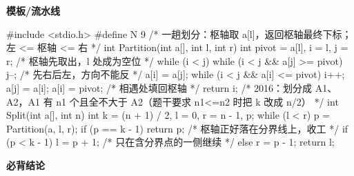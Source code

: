 \documentclass[10pt,a4paper]{ctexart}
\begin{document}
\textbf{模板/流水线}

\begin{codebox}
#include <stdio.h>
#define N 9
/* 一趟划分：枢轴取 a[l]，返回枢轴最终下标；左 <= 枢轴 <= 右 */
int Partition(int a[], int l, int r) {
    int pivot = a[l], i = l, j = r;             /* 枢轴先取出，l 处成为空位 */
    while (i < j) {
        while (i < j && a[j] >= pivot) j--;     /* 先右后左，方向不能反 */
        a[i] = a[j];
        while (i < j && a[i] <= pivot) i++;
        a[j] = a[i];
    }
    a[i] = pivot;                               /* 相遇处填回枢轴 */
    return i;
}
/* 2016：划分成 A1、A2，A1 有 n1 个且全不大于 A2（题干要求 n1<=n2 时把 k 改成 n/2） */
int Split(int a[], int n) {
    int k = (n + 1) / 2, l = 0, r = n - 1, p;
    while (l < r) {
        p = Partition(a, l, r);
        if (p == k - 1) return p;               /* 枢轴正好落在分界线上，收工 */
        if (p < k - 1) l = p + 1;               /* 只在含分界点的一侧继续 */
        else r = p - 1;
    }
    return l;
}
\end{codebox}





\textbf{必背结论}
\end{document}
